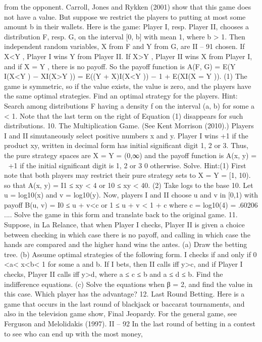 from the opponent.
Carroll, Jones and Rykken (2001) show that this game does not have a value. But
suppose we restrict the players to putting at most some amount b in their wallets. Here is
the game:
Player I, resp. Player II, chooses a distribution F, resp. G, on the interval [0, b] with
mean 1, where b > 1. Then independent random variables, X from F and Y from G, are
II – 91
chosen. If X<Y , Player I wins Y from Player II. If X>Y , Player II wins X from Player
I, and if X = Y , there is no payoff. So the payoff function is
A(F, G) = E(Y I(X<Y ) − XI(X>Y ))
= E((Y + X)I(X<Y )) − 1 + E(XI(X = Y )). (1)
The game is symmetric, so if the value exists, the value is zero, and the players have the
same optimal strategies. Find an optimal strategy for the players. Hint: Search among
distributions F having a density f on the interval (a, b) for some a < 1. Note that the last
term on the right of Equation (1) disappears for such distributions.
10. The Multiplication Game. (See Kent Morrison (2010).) Players I and II
simutaneously select positive numbers x and y. Player I wins +1 if the product xy, written
in decimal form has initial significant digit 1, 2 or 3. Thus, the pure strategy spaces are
X = Y = (0,∞) and the payoff function is
A(x, y) =  +1 if the initial significant digit is 1, 2 or 3
0 otherwise.
Solve.
Hint:(1) First note that both players may restrict their pure strategy sets to X =
Y = [1, 10). so that
A(x, y) = I{1 ≤ xy < 4 or 10 ≤ xy < 40}.
(2) Take logs to the base 10. Let u = log10(x) and v = log10(y). Now, players I and
II choose u and v in [0,1) with payoff
B(u, v) = I{0 ≤ u + v<c or 1 ≤ u + v < 1 + c}
where c = log10(4) = .60206 .... Solve the game in this form and translate back to the
original game.
11. Suppose, in La Relance, that when Player I checks, Player II is given a choice
between checking in which case there is no payoff, and calling in which case the hands are
compared and the higher hand wins the antes.
(a) Draw the betting tree.
(b) Assume optimal strategies of the following form. I checks if and only if 0 <a<
x<b< 1 for some a and b. If I bets, then II calls iff y>c, and if Player I checks, Player
II calls iff y>d, where a ≤ c ≤ b and a ≤ d ≤ b. Find the indifference equations.
(c) Solve the equations when β = 2, and find the value in this case. Which player has
the advantage?
12. Last Round Betting. Here is a game that occurs in the last round of blackjack
or baccarat tournaments, and also in the television game show, Final Jeopardy. For the
general game, see Ferguson and Melolidakis (1997).
II – 92
In the last round of betting in a contest to see who can end up with the most money,
